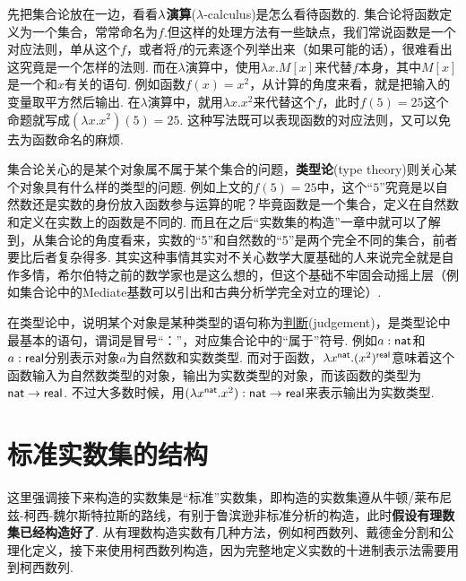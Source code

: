 \documentclass[UTF8]{ctexart}
\newcommand{\trm}[1]{{\rm #1}}
\begin{document}
先把集合论放在一边，看看\(\trm{\lambda}\)\textbf{演算}(\(\lambda\)-calculus)是怎么看待函数的. 集合论将函数定义为一个集合，常常命名为\(f\).但这样的处理方法有一些缺点，我们常说函数是一个对应法则，单从这个\(f\)，或者将\(f\)的元素逐个列举出来（如果可能的话），很难看出这究竟是一个怎样的法则. 而在\(\lambda\)演算中，使用\(\lambda x.M[x]\)来代替\(f\)本身，其中\(M[x]\)是一个和\(x\)有关的语句. 例如函数\(f(x)=x^2\)，从计算的角度来看，就是把输入的变量取平方然后输出. 在\(\lambda\)演算中，就用\(\lambda x.x^2\)来代替这个\(f\)，此时\(f(5)=25\)这个命题就写成\((\lambda x.x^2)(5)=25\). 这种写法既可以表现函数的对应法则，又可以免去为函数命名的麻烦.

集合论关心的是某个对象属不属于某个集合的问题，\textbf{类型论}(type theory)则关心某个对象具有什么样的类型的问题. 例如上文的\(f(5)=25\)中，这个“\(5\)”究竟是以自然数还是实数的身份放入函数参与运算的呢？毕竟函数是一个集合，定义在自然数和定义在实数上的函数是不同的. 而且在之后“实数集的构造”一章中就可以了解到，从集合论的角度看来，实数的“5”和自然数的“5”是两个完全不同的集合，前者要比后者复杂得多. 其实这种事情其实对不关心数学大厦基础的人来说完全就是自作多情，希尔伯特之前的数学家也是这么想的，但这个基础不牢固会动摇上层（例如集合论中的Mediate基数可以引出和古典分析学完全对立的理论）.

在类型论中，说明某个对象是某种类型的语句称为\uline{判断}(judgement)，是类型论中最基本的语句，谓词是冒号“：”，对应集合论中的“属于”符号. 例如\(a:{\sf nat}\)和\(a:{\sf real}\)分别表示对象\(a\)为自然数和实数类型. 而对于函数，\(\lambda x^{\sf nat}. (x^2)^{\sf real}\)意味着这个函数输入为自然数类型的对象，输出为实数类型的对象，而该函数的类型为\({\sf nat}\to{\sf real}\). 不过大多数时候，用\((\lambda x^{\sf nat}. x^2):{\sf nat} \to {\sf real}\)来表示输出为实数类型.

\newpage

\tableofcontents
\newpage

\section{标准实数集的结构}

这里强调接下来构造的实数集是“标准”实数集，即构造的实数集遵从牛顿/莱布尼兹-柯西-魏尔斯特拉斯的路线，有别于鲁滨逊非标准分析的构造，此时\textbf{假设有理数集已经构造好了}. 从有理数构造实数有几种方法，例如柯西数列、戴德金分割和公理化定义，接下来使用柯西数列构造，因为完整地定义实数的十进制表示法需要用到柯西数列.

\end{document}
